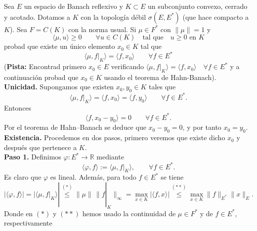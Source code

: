 \documentclass[12pt]{article}
\begin{document}
    \begin{ejercicio}[2 puntos]
        Sea $E$ un espacio de Banach reflexivo y $K\subset E$ un subconjunto convexo, cerrado y acotado. Dotamos a $K$ con la topología débil $\sigma(E,E^\ast)$ (que hace compacto a $K$). Sea $F=C(K)$ con la norma usual. Si $\mu\in F^\ast$ con $\|\mu\| = 1$ y
        \begin{equation*}
            \langle \mu,u \rangle \geq 0 \qquad \forall u\in C(K) \quad \text{tal que}\quad u\geq 0 \text{\ en\ } K
        \end{equation*}
        probad que existe un único elemento $x_0\in K$ tal que
        \begin{equation*}
            \langle \mu, f\big|_{K} \rangle  = \langle f,x_0 \rangle  \qquad \forall f\in E^\ast
        \end{equation*}
        (\textbf{Pista:} Encontrad primero $x_0\in E$ verificando $\langle \mu,f\big|_K \rangle = \langle f,x_0 \rangle\quad  \forall f\in E^\ast  $ y a continuación probad que $x_0\in K$ usando el teorema de Hahn-Banach).\\

    \textbf{Unicidad.}
        Supongamos que existen $x_0,y_0\in K$ tales que
        \begin{equation*}
        \langle \mu,f|_K\rangle = \langle f,x_0\rangle = \langle f,y_0\rangle
        \qquad \forall f\in E^\ast.
        \end{equation*}
        Entonces
        \begin{equation*}
        \langle f,x_0-y_0\rangle = 0 \qquad \forall f\in E^\ast.
        \end{equation*}
        Por el teorema de Hahn--Banach se deduce que $x_0-y_0=0$, y por tanto $x_0=y_0$.\\
        
    \textbf{Existencia.}
        Procedemos en dos pasos, primero veremos que existe dicho $x_0$ y después que pertenece a $K$.\\
                
        \textbf{Paso 1.}
        Definimos $\varphi:E^\ast\to\mathbb{R}$ mediante
        \begin{equation*}
        \langle \varphi,f\rangle := \langle \mu,f|_K\rangle,
        \qquad \forall f\in E^\ast.
        \end{equation*}
        Es claro que $\varphi$ es lineal. Además, para todo $f\in E^\ast$ se tiene
        \begin{equation*}
            |\langle \varphi,f\rangle|
            = |\langle \mu,f|_K\rangle|
            \overset{(*)}{\le} \|\mu\|\,\|f|_K\|_\infty
            = \max_{x\in K} |\langle f,x\rangle|
            \overset{(**)}{\le} \max_{x\in K} \|f\|_{E^\ast}\|x\|_E.
        \end{equation*}
        Donde en $(*)$ y $(**)$ hemos usado la continuidad de $\mu \in F^\ast$ y de $f \in E^\ast$, respectivamente\\
        

\end{ejercicio}
\end{document}
